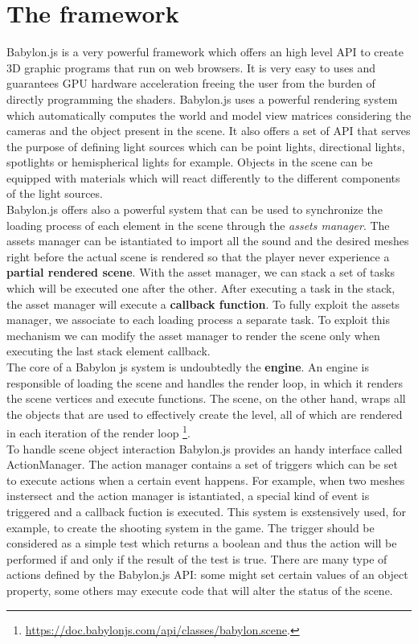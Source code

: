 \documentclass[14pt]{article}
\begin{document}
\section{The framework}\label{sec:technicalManual}
Babylon.js is a very powerful framework which offers an high level API to create 3D graphic programs that run on web browsers. It is very easy to uses and guarantees GPU hardware acceleration freeing the user from the burden of directly programming the shaders. Babylon.js uses a powerful rendering system which automatically computes the world and model view matrices considering the cameras and the object present in the scene. It also offers a set of API that serves the purpose of defining light sources which can be point lights, directional lights, spotlights or hemispherical lights for example. Objects in the scene can be equipped with materials which will react differently to the different components of the light sources. \\
Babylon.js offers also a powerful system that can be used to synchronize the loading process of each element in the scene through the \textit{assets manager}. The assets manager can be istantiated to import all the sound and the desired meshes right before the actual scene is rendered so that the player never experience a \textbf{partial rendered scene}. With the asset manager, we can stack a set of tasks which will be executed one after the other. After executing a task in the stack, the asset manager will execute a \textbf{callback function}. To fully exploit the assets manager, we associate to each loading process a separate task. To exploit this mechanism we can modify the asset manager to render the scene only when executing the last stack element callback.\\
The core of a Babylon js system is undoubtedly the \textbf{engine}. An engine is responsible of loading the scene and handles the render loop, in which it renders the scene vertices and execute functions. The scene, on the other hand, wraps all the objects that are used to effectively create the level, all of which are rendered in each iteration of the render loop \footnote{\url{https://doc.babylonjs.com/api/classes/babylon.scene}.}.\\
To handle scene object interaction Babylon.js provides an handy interface called ActionManager. The action manager contains a set of triggers which can be set to execute actions when a certain event happens. For example, when two meshes instersect and the action manager is istantiated, a special kind of event is triggered and a callback fuction is executed. This system is exstensively used, for example, to create the shooting system in the game. The trigger should be considered as a simple test which returns a boolean and thus the action will be performed if and only if the result of the test is true. There are many type of actions defined by the Babylon.js API: some might set certain values of an object property, some others may execute code that will alter the status of the scene.\\
\end{document}

